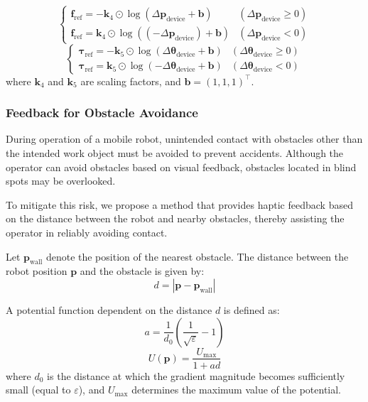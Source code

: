 \documentclass{WileyMSP-template}
\begin{document}
\begin{equation}
  \begin{cases}
    \bm{f}_{\text{ref}} = - \bm{k}_4 \odot \log (\Delta \bm{p}_{\text{device}} + \bm{b}) & (\Delta \bm{p}_{\text{device}} \geq 0) \\
    \bm{f}_{\text{ref}} = \bm{k}_4 \odot \log ((-\Delta \bm{p}_{\text{device}}) + \bm{b}) & (\Delta \bm{p}_{\text{device}} < 0)
  \end{cases}
\end{equation}
\begin{equation}
  \begin{cases}
    \bm{\tau}_{\text{ref}} = - \bm{k}_5 \odot \log (\Delta \bm{\theta}_{\text{device}} + \bm{b}) & (\Delta \bm{\theta}_{\text{device}} \geq 0) \\
    \bm{\tau}_{\text{ref}} = \bm{k}_5 \odot \log (-\Delta \bm{\theta}_{\text{device}} + \bm{b}) & (\Delta \bm{\theta}_{\text{device}} < 0)
  \end{cases}
\end{equation}
where $\bm{k}_4$ and $\bm{k}_5$ are scaling factors, and $\bm{b} = (1, 1, 1)^\top$.

\subsubsection{Feedback for Obstacle Avoidance}\label{subsec:feedback_from_obstacle}

During operation of a mobile robot, unintended contact with obstacles other than the intended work object must be avoided to prevent accidents.  
Although the operator can avoid obstacles based on visual feedback, obstacles located in blind spots may be overlooked.

To mitigate this risk, we propose a method that provides haptic feedback based on the distance between the robot and nearby obstacles, thereby assisting the operator in reliably avoiding contact.

Let $\bm{p}_{\text{wall}}$ denote the position of the nearest obstacle.  
The distance between the robot position $\bm{p}$ and the obstacle is given by:
\begin{equation}
  d = |\bm{p} - \bm{p}_{\text{wall}}|
\end{equation}

A potential function dependent on the distance $d$ is defined as:
\begin{equation}
  a = \frac{1}{d_0} \left( \frac{1}{\sqrt{\varepsilon}} - 1 \right)
\end{equation}
\begin{equation}
  U(\bm{p}) = \frac{U_{\max}}{1 + a d}
\end{equation}
where $d_0$ is the distance at which the gradient magnitude becomes sufficiently small (equal to $\varepsilon$), and $U_{\max}$ determines the maximum value of the potential.
\end{document}

